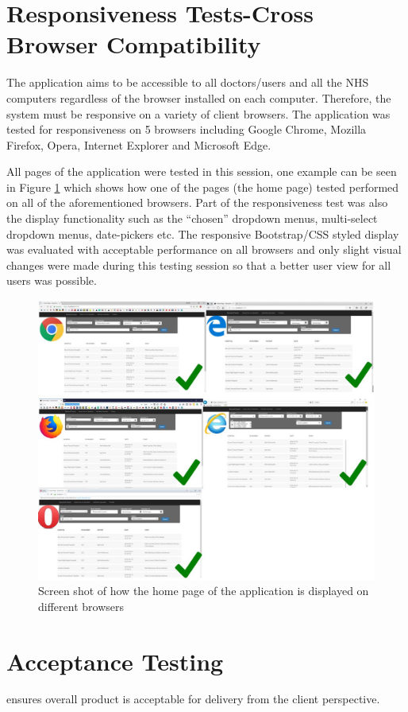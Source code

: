 \section{Responsiveness Tests-Cross Browser Compatibility}
\label{responsiveness_tests}

The application aims to be accessible to all doctors/users and all the NHS computers regardless of the browser installed on each computer. Therefore, the system must be responsive on a variety of client browsers. The application was tested for responsiveness on 5 browsers including Google Chrome, Mozilla Firefox, Opera, Internet Explorer and Microsoft Edge.

All pages of the application were tested in this session, one example can be seen in Figure \ref{responsiveness_test} which shows how one of the pages (the home page) tested performed on all of the aforementioned browsers. Part of the responsiveness test was also the display functionality such as the 	``chosen'' dropdown menus, multi-select dropdown menus, date-pickers etc. The responsive Bootstrap/CSS styled display was evaluated with acceptable performance on all browsers and only slight visual changes were made during this testing session so that a better user view for all users was possible.


\begin{figure}[!ht]
\begin{center}
\includegraphics[width=17cm]{imgs/responsiveness_test.jpg}
\end{center}\vspace{-0.3cm}
\caption[Responsiveness Tests]{Screen shot of how the home page of the application is displayed on different browsers} \label{responsiveness_test}
\end{figure}

\section{Acceptance Testing}
\label{acceptance_testing}


ensures overall product is acceptable for delivery from the client perspective.

